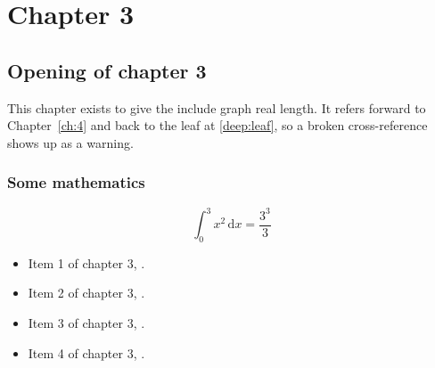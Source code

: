 \chapter{Chapter 3}
\label{ch:3}
\section{Opening of chapter 3}
This chapter exists to give the include graph real length. It refers
forward to Chapter~\ref{ch:4} and back to the leaf
at \ref{deep:leaf}, so a broken cross-reference shows up as a warning.

\subsection{Some mathematics}
\begin{equation}
  \int_0^{3} x^{2} \, \mathrm{d}x = \frac{3^{3}}{3}
\end{equation}

\begin{itemize}
  \item Item 1 of chapter 3, .
  \item Item 2 of chapter 3, .
  \item Item 3 of chapter 3, .
  \item Item 4 of chapter 3, .
\end{itemize}
